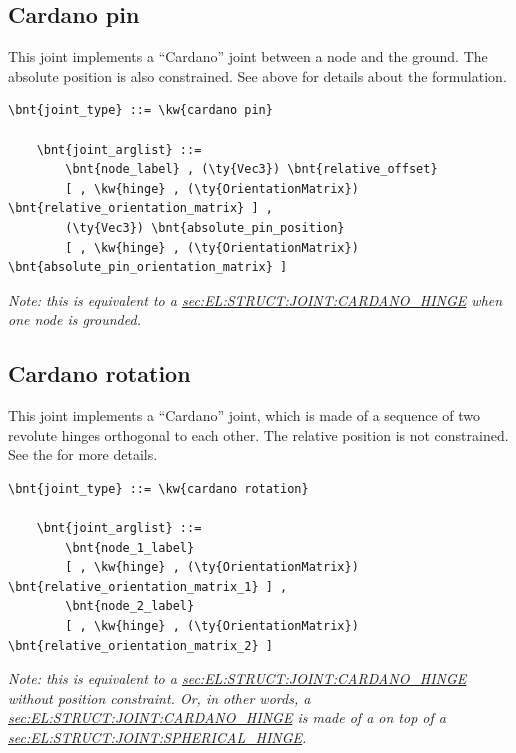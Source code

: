\subsection{Cardano pin}
\label{sec:EL:STRUCT:JOINT:CARDANO_PIN}
This joint implements a ``Cardano'' joint between a node and the ground.
The absolute position is also constrained.
See above for details about the formulation.
\begin{Verbatim}[commandchars=\\\{\}]
    \bnt{joint_type} ::= \kw{cardano pin}

    \bnt{joint_arglist} ::= 
        \bnt{node_label} , (\ty{Vec3}) \bnt{relative_offset}
        [ , \kw{hinge} , (\ty{OrientationMatrix}) \bnt{relative_orientation_matrix} ] ,
        (\ty{Vec3}) \bnt{absolute_pin_position}
        [ , \kw{hinge} , (\ty{OrientationMatrix}) \bnt{absolute_pin_orientation_matrix} ]
\end{Verbatim}
\emph{Note: this is equivalent to a
\hyperref{\kw{cardano hinge}}{\kw{cardano hinge} (see Section~}{)}{sec:EL:STRUCT:JOINT:CARDANO_HINGE}
when one node is grounded.
}

\subsection{Cardano rotation}
\label{sec:EL:STRUCT:JOINT:CARDANO_ROTATION}
This joint implements a ``Cardano'' joint, which is made of a sequence
of two revolute hinges orthogonal to each other.
The relative position is not constrained.
See the  for more details.
\begin{Verbatim}[commandchars=\\\{\}]
    \bnt{joint_type} ::= \kw{cardano rotation}

    \bnt{joint_arglist} ::= 
        \bnt{node_1_label}
        [ , \kw{hinge} , (\ty{OrientationMatrix}) \bnt{relative_orientation_matrix_1} ] ,
        \bnt{node_2_label}
        [ , \kw{hinge} , (\ty{OrientationMatrix}) \bnt{relative_orientation_matrix_2} ]
\end{Verbatim}

\emph{Note: this is equivalent to a
\hyperref{\kw{cardano hinge}}{\kw{cardano hinge} (see Section~}{)}{sec:EL:STRUCT:JOINT:CARDANO_HINGE}
without position constraint.
Or, in other words, a 
\hyperref{\kw{cardano hinge}}{\kw{cardano hinge} (see Section~}{)}{sec:EL:STRUCT:JOINT:CARDANO_HINGE}
is made of a  on top of a 
\hyperref{\kw{spherical hinge}}{\kw{spherical hinge} (see Section~}{)}{sec:EL:STRUCT:JOINT:SPHERICAL_HINGE}.
}



